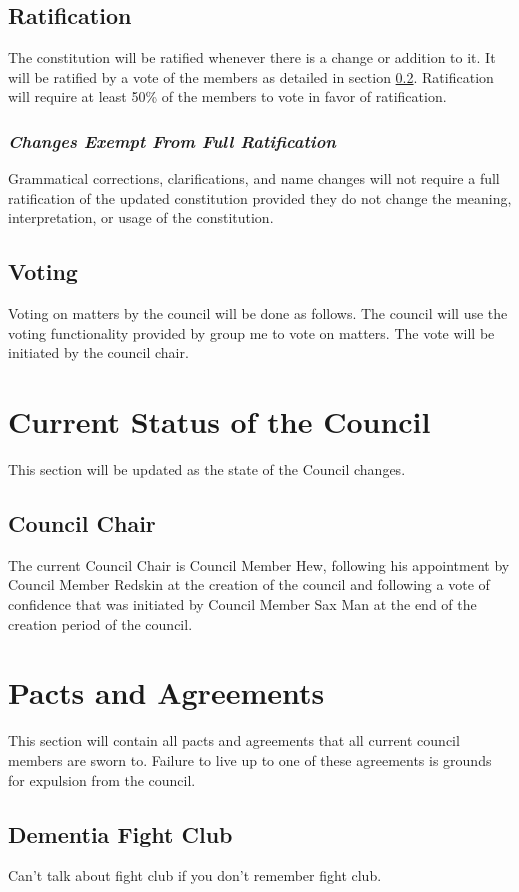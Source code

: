 \documentclass[letterpaper]{article}
\begin{document}
\subsection{Ratification}
The constitution will be ratified whenever there is a change or addition to it. It will be ratified by a vote of the members as detailed in section \ref{subsec:voting}. Ratification will require at least 50\% of the members to vote in favor of ratification.
\subsubsection{\textit{Changes Exempt From Full Ratification}}
Grammatical corrections, clarifications, and name changes will not require a full ratification of the updated constitution provided they do not change the meaning, interpretation, or usage of the constitution.

\subsection{Voting}
\label{subsec:voting}
Voting on matters by the council will be done as follows. The council will use the voting functionality provided by group me to vote on matters. The vote will be initiated by the council chair.
\newpage
\section{Current Status of the Council}
\label{sec:status}
This section will be updated as the state of the Council changes.

\subsection{Council Chair}
The current Council Chair is Council Member Hew, following his appointment by Council Member Redskin at the creation of the council and following a vote of confidence that was initiated by Council Member Sax Man at the end of the creation period of the council.

\section{Pacts and Agreements}
\label{sec:pacts}
This section will contain all pacts and agreements that all current council members are sworn to.
Failure to live up to one of these agreements is grounds for expulsion from the council.

\subsection{Dementia Fight Club}
\label{subsec:pacts:dementia}
Can't talk about fight club if you don't remember fight club.
\end{document}
